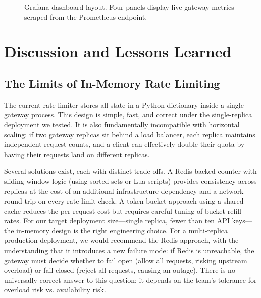\documentclass[10pt,journal]{IEEEtran}
\begin{document}
\begin{figure}[t]
\centering
{}
\caption{Grafana dashboard layout. Four panels display live gateway metrics scraped from the Prometheus endpoint.}
\label{fig:grafana}
\end{figure}

\section{Discussion and Lessons Learned}\label{sec:discussion}

\subsection{The Limits of In-Memory Rate Limiting}

The current rate limiter stores all state in a Python dictionary inside a single gateway process. This design is simple, fast, and correct under the single-replica deployment we tested. It is also fundamentally incompatible with horizontal scaling: if two gateway replicas sit behind a load balancer, each replica maintains independent request counts, and a client can effectively double their quota by having their requests land on different replicas.

Several solutions exist, each with distinct trade-offs. A Redis-backed counter with sliding-window logic (using sorted sets or Lua scripts) provides consistency across replicas at the cost of an additional infrastructure dependency and a network round-trip on every rate-limit check. A token-bucket approach using a shared cache reduces the per-request cost but requires careful tuning of bucket refill rates. For our target deployment size---single replica, fewer than ten API keys---the in-memory design is the right engineering choice. For a multi-replica production deployment, we would recommend the Redis approach, with the understanding that it introduces a new failure mode: if Redis is unreachable, the gateway must decide whether to fail open (allow all requests, risking upstream overload) or fail closed (reject all requests, causing an outage). There is no universally correct answer to this question; it depends on the team's tolerance for overload risk vs. availability risk.
\end{document}

